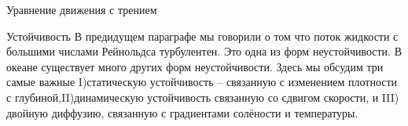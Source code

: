 \begin{chapter}{Уравнение движения с трением}
%
%
%
%

\begin{section}{Устойчивость}
В предидущем параграфе мы говорили о том что поток жидкости с большими
числами Рейнольдса турбулентен. Это одна из форм неустойчивости. В
океане существует много других форм неустойчивости. Здесь мы обсудим
три самые важные I)статическую устойчивость – связанную с
изменением плотности с глубиной,II)динамическую устойчивость связанную
со сдвигом скорости, и III) двойную диффузию, связанную с градиентами
солёности и температуры.
%


\end{section}
\end{chapter}
